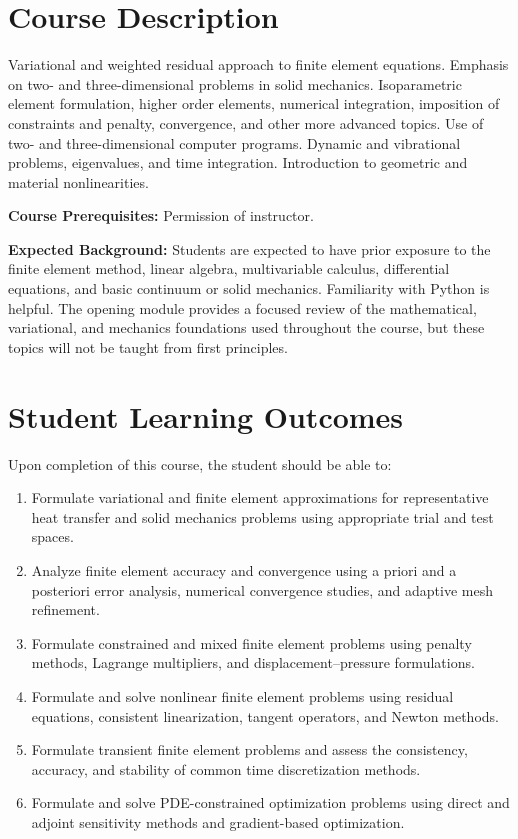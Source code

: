 \documentclass[12pt]{article}
\newcommand{\coursefield}[2]{%
  \vspace{0.2em}\noindent\textbf{#1} #2\par
}
\begin{document}
\section{Course Description}
Variational and weighted residual approach to finite element equations. Emphasis on two- and three-dimensional problems in solid mechanics. Isoparametric element formulation, higher order elements, numerical integration, imposition of constraints and penalty, convergence, and other more advanced topics. Use of two- and three-dimensional computer programs. Dynamic and vibrational problems, eigenvalues, and time integration. Introduction to geometric and material nonlinearities.

\coursefield{Course Prerequisites:}{Permission of instructor.}

\coursefield{Expected Background:}{Students are expected to have prior exposure to the finite element method, linear algebra, multivariable calculus, differential equations, and basic continuum or solid mechanics. Familiarity with Python is helpful. The opening module provides a focused review of the mathematical, variational, and mechanics foundations used throughout the course, but these topics will not be taught from first principles.}

\section{Student Learning Outcomes}
Upon completion of this course, the student should be able to:
\begin{enumerate}
  \item Formulate variational and finite element approximations for representative heat transfer and solid mechanics problems using appropriate trial and test spaces.
  \item Analyze finite element accuracy and convergence using a priori and a posteriori error analysis, numerical convergence studies, and adaptive mesh refinement.
  \item Formulate constrained and mixed finite element problems using penalty methods, Lagrange multipliers, and displacement--pressure formulations.
  \item Formulate and solve nonlinear finite element problems using residual equations, consistent linearization, tangent operators, and Newton methods.
  \item Formulate transient finite element problems and assess the consistency, accuracy, and stability of common time discretization methods.
  \item Formulate and solve PDE-constrained optimization problems using direct and adjoint sensitivity methods and gradient-based optimization.
\end{enumerate}
\end{document}
